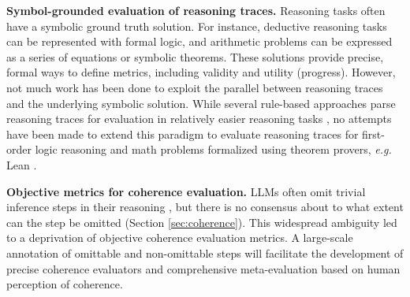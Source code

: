 
\textbf{Symbol-grounded evaluation of reasoning traces.} Reasoning tasks often have a symbolic ground truth solution. For instance, deductive reasoning tasks can be represented with formal logic, and arithmetic problems can be expressed as a series of equations or symbolic theorems. These solutions provide precise, formal ways to define metrics, including validity and utility (progress). However, not much work has been done to exploit the parallel between reasoning traces and the underlying symbolic solution. While several rule-based approaches parse reasoning traces for evaluation in relatively easier reasoning tasks \citep{PrOntoQA, nguyen-etal-2024-direct, li-etal-2023-making}, no attempts have been made to extend this paradigm to evaluate reasoning traces for first-order logic reasoning \citep{han-etal-2024-folio, han-etal-2024-p} and math problems formalized using theorem provers, \textit{e.g.} Lean \citep{yang2023leandojo, gao2024heraldnaturallanguageannotated}.

\textbf{Objective metrics for coherence evaluation.} LLMs often omit trivial inference steps in their reasoning \citep{PrOntoQA}, but there is no consensus about to what extent can the step be omitted (Section \ref{sec:coherence}). This widespread ambiguity led to a deprivation of objective coherence evaluation metrics. A large-scale annotation of omittable and non-omittable steps will facilitate the development of precise coherence evaluators and comprehensive meta-evaluation based on human perception of coherence.